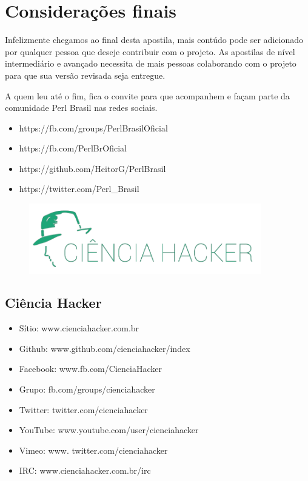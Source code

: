 \chapter{Considera\c{c}\~oes finais}

Infelizmente chegamos ao final desta apostila, mais cont\'udo pode ser adicionado por qualquer pessoa que deseje contribuir com o projeto. As apostilas de n\'ivel
intermedi\'ario e avan\c{c}ado necessita de mais pessoas colaborando com o projeto para que sua vers\~ao revisada seja entregue. 

A quem leu at\'e o fim, fica o convite para que acompanhem e fa\c{c}am parte da comunidade Perl Brasil nas redes sociais.
\begin{itemize}
    \item{https://fb.com/groups/PerlBrasilOficial}
    \item{https://fb.com/PerlBrOficial} 
    \item{https://github.com/HeitorG/PerlBrasil}
    \item{https://twitter.com/Perl\_Brasil}
\end{itemize}

\begin{figure}[!htb]
	\centering
	\includegraphics[width=0.9\textwidth]{../5_figuras/image29}
\end{figure}

\section{Ci\^encia Hacker} 
\begin{itemize}
    \item{S\'itio: www.cienciahacker.com.br} 
    \item{Github: www.github.com/cienciahacker/index}
    \item{Facebook: www.fb.com/CienciaHacker}
    \item{Grupo: fb.com/groups/cienciahacker}
    \item{Twitter: twitter.com/cienciahacker}
    \item{YouTube: www.youtube.com/user/cienciahacker}
    \item{Vimeo: www. twitter.com/cienciahacker}
    \item{IRC: www.cienciahacker.com.br/irc} 
\end{itemize}

